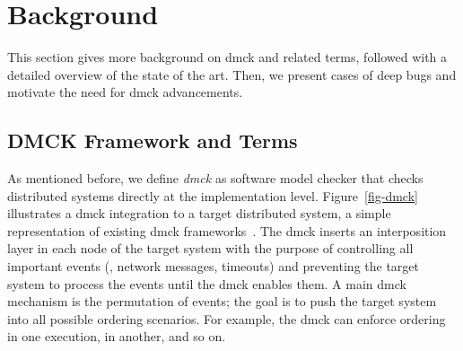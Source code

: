 
\section{Background}
\label{sec-mot}

This section gives more background on dmck and related terms,
followed with a detailed overview of the state of the art.  Then, we
present cases of deep bugs and motivate the need for dmck
advancements.


\subsection{DMCK Framework and Terms}
\label{mot-bgterms}


As mentioned before, we define {\em dmck} as  software model checker
that checks distributed systems directly at the implementation level.
Figure~\ref{fig-dmck} illustrates a dmck integration to a target
distributed system, a simple representation of existing dmck
frameworks~\cite{Guo+11-Demeter, Killian+07-LifeDeathMaceMC,
  Simsa+10-Dbug, Yang+09-Modist}.  The dmck inserts an interposition
layer in each node of the target system with the purpose of
controlling all important events (\eg, network messages, timeouts) and
preventing the target system to process the events until the dmck
enables them.  A main dmck mechanism is the permutation of events; the
goal is to push the target system into all possible ordering scenarios.
For example, the dmck can enforce  ordering in one execution,
 in another, and so on.



